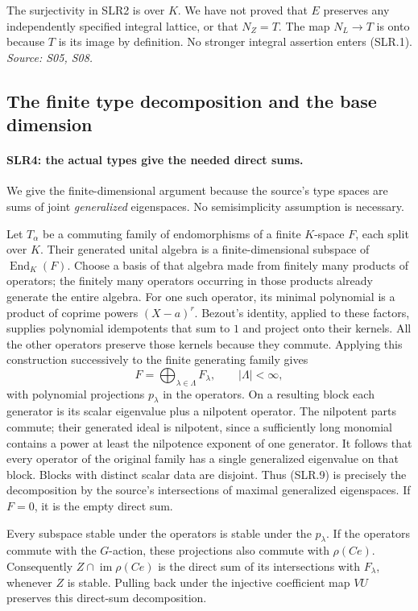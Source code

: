 The surjectivity in SLR2 is over $K$.  We have not proved that $E$
preserves any independently specified integral lattice, or that
$N_Z=T$.  The map $N_L\to T$ is onto because $T$ is its image by
definition.  No stronger integral assertion enters (SLR.1).
\emph{Source: S05, S08.}

\subsection{The finite type decomposition and the base dimension}

\paragraph{SLR4: the actual types give the needed direct sums.}
\label{claim:SLR4}
We give the finite-dimensional argument because the source's type
spaces are sums of joint \emph{generalized} eigenspaces.  No
semisimplicity assumption is necessary.

Let $T_\alpha$ be a commuting family of endomorphisms of a finite
$K$-space $F$, each split over $K$.  Their generated unital algebra
is a finite-dimensional subspace of $\operatorname{End}_K(F)$.
Choose a basis of that algebra made from finitely many products of
operators; the finitely many operators occurring in those products
already generate the entire algebra.  For one such operator, its
minimal polynomial is a product of coprime powers $(X-a)^r$.
Bezout's identity, applied to these factors, supplies polynomial
idempotents that sum to $1$ and project onto their kernels.  All the
other operators preserve those kernels because they commute.  Applying
this construction successively to the finite generating family gives
\[
          F=\bigoplus_{\lambda\in\Lambda}F_\lambda,
          \qquad |\Lambda|<\infty,                      \tag{SLR.9}
\]
with polynomial projections $p_\lambda$ in the operators.
On a resulting block each generator is its scalar eigenvalue plus a
nilpotent operator.  The nilpotent parts commute; their generated ideal
is nilpotent, since a sufficiently long monomial contains a power at
least the nilpotence exponent of one generator.  It follows that every
operator of the original family has a single generalized eigenvalue
on that block.  Blocks with distinct scalar data are disjoint.  Thus
(SLR.9) is precisely the decomposition by the source's intersections
of maximal generalized eigenspaces.  If $F=0$, it is the empty direct
sum.

Every subspace stable under the operators is stable under the
$p_\lambda$.  If the operators commute with the $G$-action, these
projections also commute with $\rho(Ce)$.  Consequently
$Z\cap\operatorname{im}\rho(Ce)$ is the direct sum of its
intersections with $F_\lambda$, whenever $Z$ is stable.
Pulling back under the injective coefficient map $VU$ preserves this
direct-sum decomposition.

